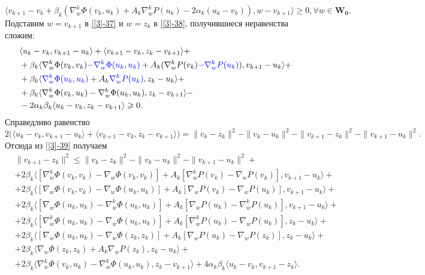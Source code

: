 \begin{equation}
\label{[3]-38}
\big\langle v_{k+1}-v_k+\beta_k(\nabla_w^k\Phi(v_k,u_k)+A_k\nabla_w^kP(u_k)-2\alpha_k(u_k-v_k)),w-v_{k+1}\big\rangle\geqslant 0, \forall w\in\mathbf{W_0}.
\end{equation}
Подставим $w=v_{k+1}$ в \eqref{[3]-37} и $w=z_k$ в \eqref{[3]-38}, получившиеся неравенства сложим:
\begin{equation}
\label{[3]-39}
\begin{aligned}
&\langle u_k-v_k,v_{k+1}-u_k\rangle +\langle v_{k+1}-v_k,z_k-v_{k+1} \rangle +\\
&+\beta_k\langle \nabla_w^k\Phi(v_k,v_k)\textcolor{blue}{-\nabla_w^k\Phi(u_k,u_k)}+A_k(\nabla_w^kP(v_k)\textcolor{blue}{-\nabla_w^kP(u_k)}),v_{k+1}-u_k\rangle +\\
&+\beta_k\langle \textcolor{blue}{\nabla_w^k\Phi(u_k,u_k)}+A_k\textcolor{blue}{\nabla_w^kP(u_k)},z_k-u_k\rangle+\\
&+\beta_k\langle \nabla_w^k\Phi(v_k,u_k)-\nabla_w^k\Phi(u_k,u_k),z_k-v_{k+1} \rangle-\\
&-2\alpha_k\beta_k\langle u_k-v_k,z_k-v_{k+1}\rangle\geqslant 0.
\end{aligned}
\end{equation}
Справедливо равенство
\begin{equation*}
2\big(\langle u_k-v_k,v_{k+1}-u_k \rangle+\langle v_{k+1}-v_{k},z_k-v_{k+1}\rangle \big)=\|v_k-z_k\|^2-\|v_k-u_k\|^2-\|v_{k+1}-z_k\|^2-\|v_{k+1}-u_k\|^2.
\end{equation*}
Отсюда из \eqref{[3]-39} получаем
\begin{equation}
\label{[3]-40}
\begin{aligned}
&\|v_{k+1}-z_k\|^2\leqslant \|v_k-z_k\|^2-\|v_k-u_k\|^2-\|v_{k+1}-u_k\|^2+\\
&+2\beta_k\big\langle [\nabla_w^k\Phi(v_k,v_k)-\nabla_w\Phi(v_k,v_k)]+A_k[\nabla_w^kP(v_k)-\nabla_wP(v_k)],v_{k+1}-u_k\big\rangle+\\
&+2\beta_k\big\langle [\nabla_w\Phi(v_k,v_k)-\nabla_w\Phi(u_k,u_k)]+A_k[\nabla_wP(v_k)-\nabla_wP(u_k)],v_{k+1}-u_k\big\rangle+\\
&+2\beta_k\big\langle [\nabla_w\Phi(u_k,u_k)-\nabla_w^k\Phi(u_k,u_k)]+A_k[\nabla_wP(u_k)-\nabla_w^kP(u_k)],v_{k+1}-u_k\big\rangle+\\
&+2\beta_k\big\langle [\nabla_w^k\Phi(u_k,u_k)-\nabla_w\Phi(u_k,u_k)]+A_k[\nabla_w^kP(u_k)-\nabla_wP(u_k)],z_k-u_k\big\rangle+\\
&+2\beta_k\big\langle [\nabla_w\Phi(u_k,u_k)-\nabla_w\Phi(z_k,z_k)]+A_k[\nabla_wP(u_k)-\nabla_wP(z_k)],z_k-u_k\big\rangle+\\
&+2\beta_k\big\langle \nabla_w\Phi(z_k,z_k)+A_k\nabla_wP(z_k),z_k-u_k\big\rangle+\\
&+2\beta_k\langle \nabla_w^k\Phi(v_k,u_k)-\nabla_w^k\Phi(u_k,u_k),z_k-v_{k+1} \rangle+4\alpha_k\beta_k\langle u_k-v_k,v_{k+1}-z_k\rangle.
\end{aligned}
\end{equation}

